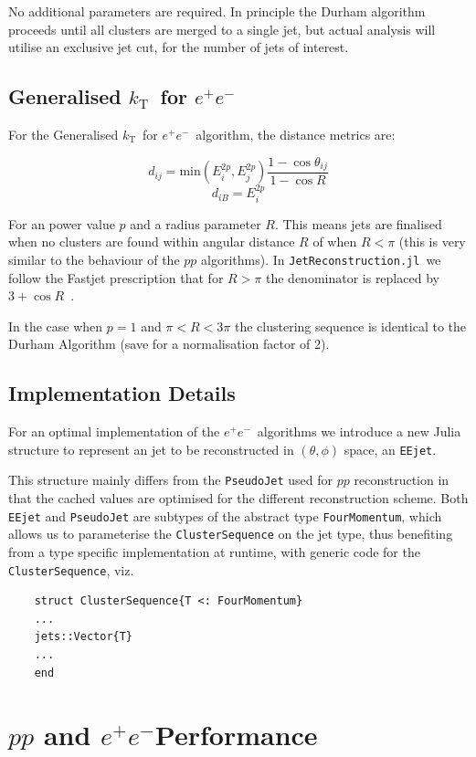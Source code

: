 \documentclass{webofc}
\newcommand{\kt}{${k}_\text{T}$}
\newcommand{\JR}{\texttt{JetReconstruction.jl}}
\newcommand{\ee}{$e^+e^-$}
\begin{document}
No additional parameters are required. In principle the Durham algorithm
proceeds until all clusters are merged to a single jet, but actual analysis will
utilise an exclusive jet cut, for the number of jets of interest.

\subsection{Generalised \kt\ for \ee}
\label{sec:getktee}

For the Generalised \kt\ for \ee\ algorithm, the distance metrics are:

$$
d_{ij} = \text{min}(E_i^{2p}, E_j^{2p}) \frac{1 - \cos \theta_{ij}}{1 - \cos R}
$$
$$
d_{iB} = E_i^{2p}
$$

For an power value $p$ and a radius parameter $R$. This means jets are finalised
when no clusters are found within angular distance $R$ of when $R<\pi$ (this is
very similar to the behaviour of the $pp$ algorithms). In \JR\ we follow the
Fastjet prescription that for $R>\pi$ the denominator is replaced by $3+\cos
R$~\cite{fastjetmanual}.

In the case when $p=1$ and $\pi < R < 3\pi$ the clustering sequence is identical
to the Durham Algorithm (save for a normalisation factor of 2).

\subsection{Implementation Details}
\label{eeimplementation}

For an optimal implementation of the \ee\ algorithms we introduce a new Julia
structure to represent an jet to be reconstructed in $(\theta, \phi)$ space, an \texttt{EEjet}.

This structure mainly differs from the \texttt{PseudoJet} used for $pp$
reconstruction in that the cached values are optimised for the different
reconstruction scheme. Both \texttt{EEjet} and \texttt{PseudoJet} are subtypes
of the abstract type \texttt{FourMomentum}, which allows us to parameterise the
\texttt{ClusterSequence} on the jet type, thus benefiting from a type specific
implementation at runtime, with generic code for the \texttt{ClusterSequence}, viz.

\begin{verbatim}
    struct ClusterSequence{T <: FourMomentum}
    ...
    jets::Vector{T}
    ...
    end
\end{verbatim}

\section{$pp$ and \ee Performance}
\label{sec:performance}
\end{document}
